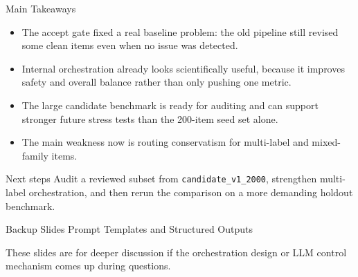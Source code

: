 \documentclass[aspectratio=169]{beamer}
\begin{document}
\begin{frame}{Main Takeaways}
  \begin{itemize}
    \item The accept gate fixed a real baseline problem: the old pipeline still revised some clean items even when no issue was detected.
    \item Internal orchestration already looks scientifically useful, because it improves safety and overall balance rather than only pushing one metric.
    \item The large candidate benchmark is ready for auditing and can support stronger future stress tests than the 200-item seed set alone.
    \item The main weakness now is routing conservatism for multi-label and mixed-family items.
  \end{itemize}

  \vspace{0.2cm}

  \begin{block}{Next steps}
    Audit a reviewed subset from \texttt{candidate\_v1\_2000}, strengthen multi-label orchestration, and then rerun the comparison on a more demanding holdout benchmark.
  \end{block}
\end{frame}
\appendix

\begin{frame}{Backup Slides}
  \centering
  \Large Prompt Templates and Structured Outputs

  \vspace{0.5cm}

  \normalsize
  These slides are for deeper discussion if the orchestration design or LLM control mechanism comes up during questions.
\end{frame}
\end{document}

